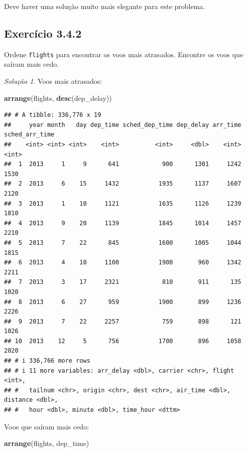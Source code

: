 \documentclass[
]{latex/krantz}
\newenvironment{Shaded}{\begin{snugshade}}{\end{snugshade}}
\newcommand{\FunctionTok}[1]{\textcolor[rgb]{0.13,0.29,0.53}{\textbf{#1}}}
\newcommand{\NormalTok}[1]{#1}
\theoremstyle{definition}
\theoremstyle{definition}
\theoremstyle{definition}
\theoremstyle{definition}
\theoremstyle{remark}
\newtheorem*{solution}{Solução}
\begin{document}
Deve haver uma solução muito mais elegante para este problema.

\hypertarget{exr3-4-2}{%
\subsection*{Exercício 3.4.2}\label{exr3-4-2}}

Ordene \texttt{flights} para encontrar os voos mais atrasados. Encontre os voos que saíram mais cedo.

\begin{solution}

Voos mais atrasados:

\begin{Shaded}
\begin{Highlighting}[]
\FunctionTok{arrange}\NormalTok{(flights, }\FunctionTok{desc}\NormalTok{(dep\_delay))}
\end{Highlighting}
\end{Shaded}

\begin{verbatim}
## # A tibble: 336,776 x 19
##     year month   day dep_time sched_dep_time dep_delay arr_time sched_arr_time
##    <int> <int> <int>    <int>          <int>     <dbl>    <int>          <int>
##  1  2013     1     9      641            900      1301     1242           1530
##  2  2013     6    15     1432           1935      1137     1607           2120
##  3  2013     1    10     1121           1635      1126     1239           1810
##  4  2013     9    20     1139           1845      1014     1457           2210
##  5  2013     7    22      845           1600      1005     1044           1815
##  6  2013     4    10     1100           1900       960     1342           2211
##  7  2013     3    17     2321            810       911      135           1020
##  8  2013     6    27      959           1900       899     1236           2226
##  9  2013     7    22     2257            759       898      121           1026
## 10  2013    12     5      756           1700       896     1058           2020
## # i 336,766 more rows
## # i 11 more variables: arr_delay <dbl>, carrier <chr>, flight <int>,
## #   tailnum <chr>, origin <chr>, dest <chr>, air_time <dbl>, distance <dbl>,
## #   hour <dbl>, minute <dbl>, time_hour <dttm>
\end{verbatim}

Voos que saíram mais cedo:

\begin{Shaded}
\begin{Highlighting}[]
\FunctionTok{arrange}\NormalTok{(flights, dep\_time)}
\end{Highlighting}
\end{Shaded}


\end{solution}
\end{document}
